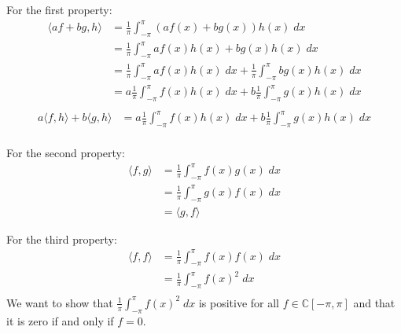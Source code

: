 \documentclass{article}
\begin{document}
\noindent For the first property: \\
\begin{align*}
    \langle af + bg, h \rangle &= \frac{1}{\pi} \int_{-\pi}^{\pi} (af(x) + bg(x))h(x)\;dx \\
    &= \frac{1}{\pi} \int_{-\pi}^{\pi} af(x)h(x) + bg(x)h(x)\;dx \\
    &= \frac{1}{\pi} \int_{-\pi}^{\pi} af(x)h(x)\;dx + \frac{1}{\pi} \int_{-\pi}^{\pi} bg(x)h(x)\;dx \\
    &= a \frac{1}{\pi} \int_{-\pi}^{\pi} f(x)h(x)\;dx + b \frac{1}{\pi} \int_{-\pi}^{\pi} g(x)h(x)\;dx \\
\end{align*}
\begin{align*}
    a \langle f, h \rangle + b \langle g, h \rangle &= a \frac{1}{\pi} \int_{-\pi}^{\pi} f(x)h(x)\;dx + b \frac{1}{\pi} \int_{-\pi}^{\pi} g(x)h(x)\;dx \\
\end{align*}

\noindent For the second property: \\
\begin{align*}
    \langle f, g \rangle &= \frac{1}{\pi} \int_{-\pi}^{\pi} f(x)g(x)\;dx \\
    &= \frac{1}{\pi} \int_{-\pi}^{\pi} g(x)f(x)\;dx \\
    &= \langle g, f \rangle
\end{align*}


\noindent For the third property: \\
\begin{align*}
    \langle f, f \rangle &= \frac{1}{\pi} \int_{-\pi}^{\pi} f(x)f(x)\;dx \\
    &= \frac{1}{\pi} \int_{-\pi}^{\pi} f(x)^2\;dx \\
\end{align*}
We want to show that $\frac{1}{\pi} \int_{-\pi}^{\pi} f(x)^2\;dx$ is positive for all $f \in \mathbb{C}[-\pi, \pi]$ and that it is zero if and only if $f = 0$.
\end{document}
